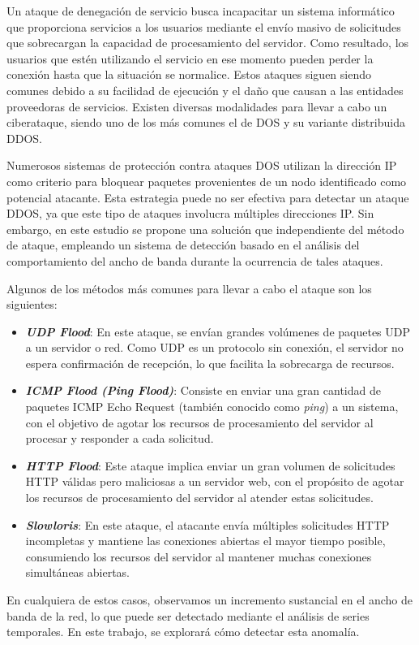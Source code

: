 Un ataque de denegación de servicio busca incapacitar un sistema informático que proporciona servicios a los usuarios mediante el envío masivo de solicitudes que sobrecargan la capacidad de procesamiento del servidor. Como resultado, los usuarios que estén utilizando el servicio en ese momento pueden perder la conexión hasta que la situación se normalice. Estos ataques siguen siendo comunes debido a su facilidad de ejecución y el daño que causan a las entidades proveedoras de servicios. Existen diversas modalidades para llevar a cabo un ciberataque, siendo uno de los más comunes el de \ac{DOS} y su variante distribuida \ac{DDOS}.

Numerosos sistemas de protección contra ataques \ac{DOS} utilizan la dirección IP como criterio para bloquear paquetes provenientes de un nodo identificado como potencial atacante. Esta estrategia puede no ser efectiva para detectar un ataque \ac{DDOS}, ya que este tipo de ataques involucra múltiples direcciones IP. Sin embargo, en este estudio se propone una solución que independiente del método de ataque, empleando un sistema de detección basado en el análisis del comportamiento del ancho de banda durante la ocurrencia de tales ataques.

Algunos de los métodos más comunes para llevar a cabo el ataque son los siguientes:
\begin{itemize}
    \item \textbf{\textit{UDP Flood}}: En este ataque, se envían grandes volúmenes de paquetes \ac{UDP} a un servidor o red. Como \ac{UDP} es un protocolo sin conexión, el servidor no espera confirmación de recepción, lo que facilita la sobrecarga de recursos.
    
    \item \textbf{\textit{ICMP Flood (Ping Flood)}}: Consiste en enviar una gran cantidad de paquetes \ac{ICMP} Echo Request (también conocido como \textit{ping}) a un sistema, con el objetivo de agotar los recursos de procesamiento del servidor al procesar y responder a cada solicitud.
    
    \item \textbf{\textit{HTTP Flood}}: Este ataque implica enviar un gran volumen de solicitudes \ac{HTTP} válidas pero maliciosas a un servidor web, con el propósito de agotar los recursos de procesamiento del servidor al atender estas solicitudes.
    
    \item \textbf{\textit{Slowloris}}: En este ataque, el atacante envía múltiples solicitudes \ac{HTTP} incompletas y mantiene las conexiones abiertas el mayor tiempo posible, consumiendo los recursos del servidor al mantener muchas conexiones simultáneas abiertas.
\end{itemize}
En cualquiera de estos casos, observamos un incremento sustancial en el ancho de banda de la red, lo que puede ser detectado mediante el análisis de series temporales.
En este trabajo, se explorará cómo detectar esta anomalía.